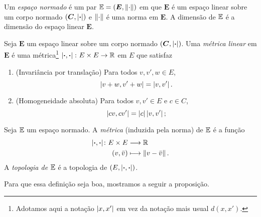 \begin{definition}
Um \emph{espaço normado} é um par $\mathbb{E} = (\bm E,\left\Vert{\cdot}\right\Vert)$ em que $\bm E$ é um espaço linear sobre um corpo normado $(\bm C,\left\vert{\bm{\cdot}}\right\vert)$ e $\left\Vert{\cdot}\right\Vert$ é uma norma em $\bm E$. A dimensão de $\mathbb{E}$ é a dimensão do espaço linear $\bm E$.
\end{definition}

\begin{definition}
Seja $\bm E$ um espaço linear sobre um corpo normado $(\bm C,\left\vert{\bm{\cdot}}\right\vert)$. Uma \emph{métrica linear} em $\bm E$ é uma métrica\footnote{Adotamos aqui a notação $\left\vert{x},{x'}\right\vert$ em vez da notação mais usual $d(x,x')$.} $\left\vert{\bm{\cdot}},{\bm{\cdot}}\right\vert\colon E \times E \to \mathbb{R}$ em $E$ que satisfaz
	\begin{enumerate}
	\item (Invariância por translação) Para todos $v,v',w \in E$,
		\begin{equation*}
		\left\vert{v+w},{v'+w}\right\vert = \left\vert{v},{v'}\right\vert.
		\end{equation*}
	\item (Homogeneidade absoluta) Para todos $v,v' \in E$ e $c \in C$,
		\begin{equation*}
		\left\vert{cv},{cv'}\right\vert = \left\vert{c}\right\vert\left\vert{v},{v'}\right\vert;
		\end{equation*}
	\end{enumerate}
\end{definition}

\begin{definition}
Seja $\mathbb{E}$ um espaço normado. A \emph{métrica} (induzida pela norma) de $\mathbb{E}$ é a função
	\begin{align*}
	{\left\vert{\bm{\cdot}},{\bm{\cdot}}\right\vert}\colon {E \times E} &\longrightarrow {\mathbb{R}} \\{(v,\bar v)} &\longmapsto \left\Vert{v - \bar v}\right\Vert.
	\end{align*}	
A \emph{topologia de $\mathbb{E}$} é a topologia de $(E,\left\vert{\bm{\cdot}},{\bm{\cdot}}\right\vert)$.
\end{definition}

Para que essa definição seja boa, mostramos a seguir a proposição.

